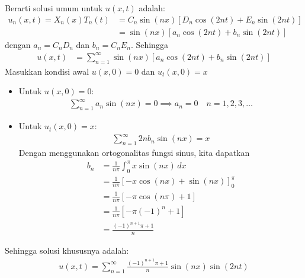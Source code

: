 \documentclass{article}
\theoremstyle{definition}
\begin{document}
\begin{enumerate}
Berarti solusi umum untuk $u(x,t)$ adalah:
\begin{align*}
  u_n(x,t) = X_n(x) T_n(t) &= C_n \sin(n x) \left[ D_n \cos(2n t) + E_n \sin(2n t) \right]\\
  &= \sin(n x) \left[ a_n \cos(2n t) + b_n \sin(2n t) \right]
\end{align*}
dengan $a_n = C_n D_n$ dan $b_n = C_n E_n$. Sehingga
\begin{align*}
  u(x,t) &= \sum_{n=1}^\infty \sin(n x) \left[ a_n \cos(2n t) + b_n \sin(2n t) \right]
\end{align*}
Masukkan kondisi awal $u(x,0) = 0$ dan $u_t(x,0) = x$
\begin{itemize}
  \item Untuk $u(x,0) = 0$:
\begin{align*}
  \sum_{n=1}^\infty a_n \sin(n x) = 0 \implies a_n = 0 \quad n=1,2,3,\ldots
\end{align*}
  \item Untuk $u_t(x,0) = x$:
\begin{align*}
  \sum_{n=1}^\infty 2n b_n \sin(n x) = x
\end{align*}
Dengan menggunakan ortogonalitas fungsi sinus, kita dapatkan
\begin{align*}
  b_n &= \frac{1}{n\pi} \int^\pi_0 x \sin(n x) \,dx\\
  &= \frac{1}{n\pi} \left[ -x \cos(n x) + \sin(nx)\right]_0^\pi \\
  &= \frac{1}{n\pi} \left[ -\pi \cos(n \pi) + 1 \right] \\
  &= \frac{1}{n\pi} \left[ -\pi (-1)^n +1\right] \\
  &= \frac{(-1)^{n+1}\pi +1}{n}
\end{align*}
\end{itemize}
Sehingga solusi khususnya adalah:
\begin{align*}
  u(x,t) = \sum_{n=1}^\infty \frac{(-1)^{n+1}\pi +1}{n}\sin(n x)\sin(2n t)
\end{align*}
\end{enumerate}
\end{document}
